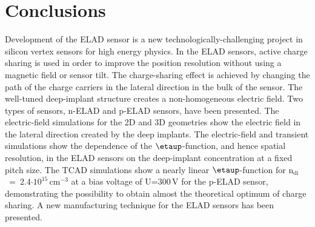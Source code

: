\documentclass[a4paper,11pt]{article}
\begin{document}
\section{Conclusions}
\label{sec:cc}
Development of the ELAD sensor is a new technologically-challenging project in silicon vertex sensors for high energy physics. 
In the ELAD sensors, active charge sharing is used in order to improve the position resolution without using a magnetic field or sensor tilt.
The charge-sharing effect is achieved by changing the path of the charge carriers in the lateral direction in the bulk of the sensor.
The well-tuned deep-implant structure creates a non-homogeneous electric field.
Two types of sensors, n-ELAD and p-ELAD sensors, have been presented.
The electric-field simulations for the 2D and 3D geometries show the electric field in the lateral direction created by the deep implants.
The electric-field and transient simulations show the dependence of the $\etaup$-function, and hence spatial resolution, in the ELAD sensors on the deep-implant concentration at a fixed pitch size.
The TCAD simulations show a nearly linear $\etaup$-function for $\mathrm{n_{di}}$~=~2.4$\mathrm{\cdot10^{15}\,cm^{-3}}$ at a bias voltage of U=300\,V for the p-ELAD sensor, demonstrating the possibility to obtain almost the theoretical optimum of charge sharing.
A new manufacturing technique for the ELAD sensors has been presented. 



{\small


}







\end{document}

